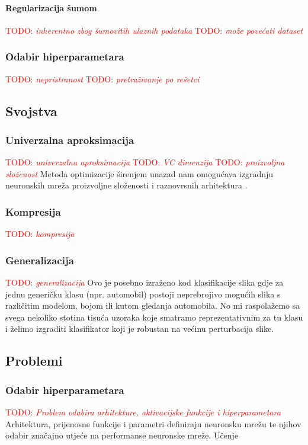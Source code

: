 \documentclass[times, utf8, diplomski]{fer}
\def\TODO#1{\noindent\textcolor{red}{TODO: \textit{#1}}\newline}
\def\todo#1{\TODO{#1}}
\begin{document}
\paragraph{Regularizacija šumom}
\todo{inherentno zbog šumovitih ulaznih podataka}
\todo{može povećati dataset}

\subsubsection{Odabir hiperparametara}
\todo{nepristranost}
\todo{pretraživanje po rešetci}

\subsection{Svojstva}
\label{sec:svojstva}

\subsubsection{Univerzalna aproksimacija}
\todo{univerzalna aproksimacija}
\todo{VC dimenzija}
\todo{proizvoljna složenost}
Metoda optimizacije širenjem unazad nam omogućava izgradnju neuronskih mreža proizvoljne složenosti i raznovrsnih arhitektura \citep{alexnet,resnet,densenet}.

\subsubsection{Kompresija}
\todo{kompresija}

\subsubsection{Generalizacija}
\todo{generalizacija}
Ovo je posebno izraženo kod klasifikacije slika gdje za jednu generičku klasu (npr. automobil) postoji neprebrojivo mogućih slika s različitim modelom, bojom ili kutom gledanja automobila. No mi raspolažemo sa svega nekoliko stotina tisuća uzoraka koje smatramo reprezentativnim za tu klasu i želimo izgraditi klasifikator koji je robustan na većinu perturbacija slike.

\subsection{Problemi}
\subsubsection{Odabir hiperparametara}
\todo{Problem odabira arhitekture, aktivacijske funkcije i hiperparametara}
Arhitektura, prijenosne funkcije i parametri definiraju neuronsku mrežu te njihov odabir značajno utjeće na performanse neuronske mreže. Učenje 
\end{document}
